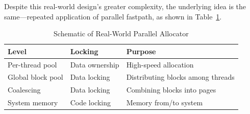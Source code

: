 Despite this real-world design's greater complexity, the underlying
idea is the same---repeated application of parallel fastpath,
as shown in
Table~\ref{fig:app:questions:Schematic of Real-World Parallel Allocator}.

\begin{table}[tbp]
\small
\centering
\renewcommand*{\arraystretch}{1.25}
\begin{tabularx}{\twocolumnwidth}{ll>{\raggedright\arraybackslash}X}
\toprule
Level	& Locking & Purpose \\
\midrule
Per-thread pool	  & Data ownership & High-speed allocation \\
Global block pool & Data locking   & Distributing blocks among threads \\
Coalescing	  & Data locking   & Combining blocks into pages \\
System memory	  & Code locking   & Memory from/to system \\
\bottomrule
\end{tabularx}
\caption{Schematic of Real-World Parallel Allocator}
\label{fig:app:questions:Schematic of Real-World Parallel Allocator}
\end{table}



